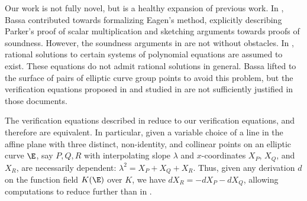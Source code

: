 \documentclass[11pt,letterpaper]{article}
\theoremstyle{definition}
\newcommand{\6}{\mathbf}
\newcommand{\7}{\mathcal}
\begin{document}
Our work is not fully novel, but is a healthy expansion of previous work. In \cite{SoundnessForDLP}, Bassa contributed towards formalizing Eagen's method, explicitly describing Parker's proof of scalar multiplication and sketching arguments towards proofs of soundness.
However, the soundness arguments in \cite{SoundnessForDLP} are not without  obstacles. In \cite{Eagen}, rational solutions to certain systems of polynomial equations are assumed to exist.
These equations do not admit rational solutions in general. Bassa lifted to the surface of pairs of elliptic curve group points to avoid this problem, but the verification equations proposed in \cite{Eagen} and studied in \cite{SoundnessForDLP} are not sufficiently justified in those documents. 


The verification equations described in \cite{SoundnessForDLP} reduce to our verification equations, and therefore are equivalent. In particular, given a variable choice of a line in the affine plane with three distinct, non-identity, and collinear points on an elliptic curve $\E$, say $P, Q, R$ with interpolating slope $\lambda$ and $x$-coordinates $X_P$, $X_Q$, and $X_R$, are necessarily dependent: $\lambda^2 = X_P + X_Q + X_R$. Thus, given any derivation $d$ on the function field $K(\E)$ over $K$, we have $dX_R = -dX_P - dX_Q$, allowing computations to reduce further than in \cite{SoundnessForDLP}.
\end{document}
